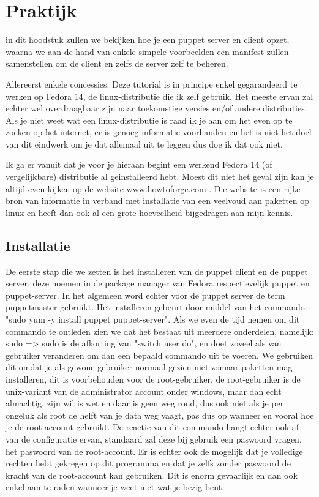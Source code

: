 \chapter{Praktijk}

in dit hoodstuk zullen we bekijken hoe je een puppet server en client opzet, waarna we aan de hand van enkele simpele voorbeelden een manifest zullen samenstellen om de client en zelfs de server zelf te beheren.

Allereerst enkele concessies: Deze tutorial is in principe enkel gegarandeerd te werken op Fedora 14, de linux-distributie die ik zelf gebruik. Het meeste ervan zal echter wel overdraagbaar zijn naar toekomstige versies en/of andere distributies. Als je niet weet wat een linux-distributie is raad ik je aan om het even op te zoeken op het internet, er is genoeg informatie voorhanden en het is niet het doel van dit eindwerk om je dat allemaal uit te leggen dus doe ik dat ook niet.

Ik ga er vanuit dat je voor je hieraan begint een werkend Fedora 14 (of vergelijkbare) distributie al geinstalleerd hebt. Moest dit niet het geval zijn kan je altijd even kijken op de website www.howtoforge.com . Die website is een rijke bron van informatie in verband met installatie van een veelvoud aan paketten op linux en heeft dan ook al een grote hoeveelheid bijgedragen aan mijn kennis.


\section{Installatie}

De eerste stap die we zetten is het installeren van de puppet client en de puppet server, deze noemen in de package manager van Fedora respectievelijk puppet en puppet-server. In het algemeen word echter voor de puppet server de term puppetmaster gebruikt. Het installeren gebeurt door middel van het commando: "sudo yum -y install puppet puppet-server". Als we even de tijd nemen om dit commando te ontleden zien we dat het bestaat uit meerdere onderdelen, namelijk: sudo => sudo is de afkorting van "switch user do", en doet zoveel als van gebruiker veranderen om dan een bepaald commando uit te voeren. We gebruiken dit omdat je als gewone gebruiker normaal gezien niet zomaar paketten mag installeren, dit is voorbehouden voor de root-gebruiker. de root-gebruiker is de unix-variant van de administrator account onder windows, maar dan echt almachtig. zijn wil is wet en daar is geen weg rond, dus ook niet als je per ongeluk als root de helft van je data weg vaagt, pas dus op wanneer en vooral hoe je de root-account gebruikt. De reactie van dit commando hangt echter ook af van de configuratie ervan, standaard zal deze bij gebruik een paswoord vragen, het paswoord van de root-account. Er is echter ook de mogelijk dat je volledige rechten hebt gekregen op dit programma en dat je zelfs zonder paswoord de kracht van de root-account kan gebruiken. Dit is enorm gevaarlijk en dan ook enkel aan te raden wanneer je weet met wat je bezig bent.

